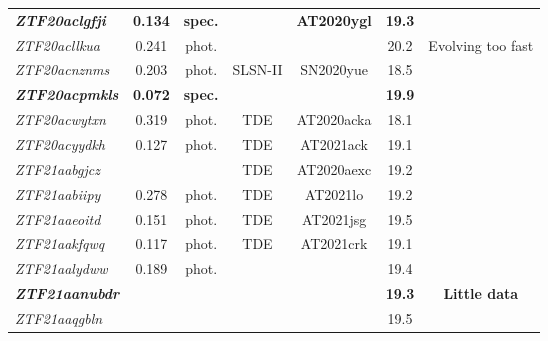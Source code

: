 \begin{table*}
\begin{tabular}{l  c  c  c   c  c  c}
    \textbf{\textit{ZTF20aclgfji}} & \textbf{0.134} & \textbf{spec.} & ~                       & \textbf{AT2020ygl} & \textbf{19.3}              &                      \\
    \textit{ZTF20acllkua}          & 0.241          & phot.          & ~                       & ~                  & 20.2                       & Evolving too fast    \\
    \textit{ZTF20acnznms}          & 0.203          & phot.          & SLSN-II                 & SN2020yue          & 18.5                       &                      \\
    \textbf{\textit{ZTF20acpmkls}} & \textbf{0.072} & \textbf{spec.} & ~                       & ~                  & \textbf{19.9}              &                      \\
    \textit{ZTF20acwytxn}          & 0.319          & phot.          & TDE                     & AT2020acka         & 18.1                       &                      \\
    \textit{ZTF20acyydkh}          & 0.127          & phot.          & TDE                     & AT2021ack          & 19.1                       &                      \\
    \textit{ZTF21aabgjcz}          & ~              & ~              & TDE                     & AT2020aexc         & 19.2                       &                      \\
    \textit{ZTF21aabiipy}          & 0.278          & phot.          & TDE                     & AT2021lo           & 19.2                       &                      \\
    \textit{ZTF21aaeoitd}          & 0.151          & phot.          & TDE                     & AT2021jsg          & 19.5                       &                      \\
    \textit{ZTF21aakfqwq}          & 0.117          & phot.          & TDE                     & AT2021crk          & 19.1                       &                      \\
    \textit{ZTF21aalydww}          & 0.189          & phot.          & ~                       & ~                  & 19.4                       &                      \\
    \textbf{\textit{ZTF21aanubdr}} & ~              & ~              & ~                       & ~                  & \textbf{19.3}              & \textbf{Little data} \\
    \textit{ZTF21aaqgbln}          & ~              & ~              & ~                       & ~                  & 19.5                       &                      \\

\end{tabular}
\end{table*}

